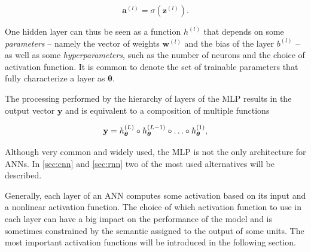 \begin{equation}\label{eq:MLP_activation}
    \mathbf{a}^{(l)} = \sigma(\mathbf{z}^{(l)}).
\end{equation}

One hidden layer can thus be seen as a function $h^{(l)}$ that depends on some
\emph{parameters} -- namely the vector of weights $\mathbf{w}^{(l)}$ and the
bias of the layer $b^{(l)}$ -- as well as some \emph{hyperparameters}, such as
the number of neurons and the choice of activation function. It is common
to denote the set of trainable parameters that fully characterize a layer as
$\boldsymbol{\theta}$.

The processing performed by the hierarchy of layers of the MLP results in the
output vector $\mathbf{y}$ and is equivalent to a composition of multiple
functions

\begin{equation}\label{eq:fn_composition}
    \textbf{y} = h^{(L)}_{\boldsymbol{\theta}} \composition
        h^{(L-1)}_{\boldsymbol{\theta}} \composition
        \dots \composition h^{(1)}_{\boldsymbol{\theta}},
\end{equation}

\noindent Although very common and widely used, the MLP is not the only
architecture for ANNs. In \autoref{sec:cnn} and \autoref{sec:rnn} two of the
most used alternatives will be described.

Generally, each layer of an ANN computes some activation based on its input and
a nonlinear activation function. The choice of which activation function to use
in each layer can have a big impact on the performance of the model and is
sometimes constrained by the semantic assigned to the output of some units. The
most important activation functions will be introduced in the following
section.

